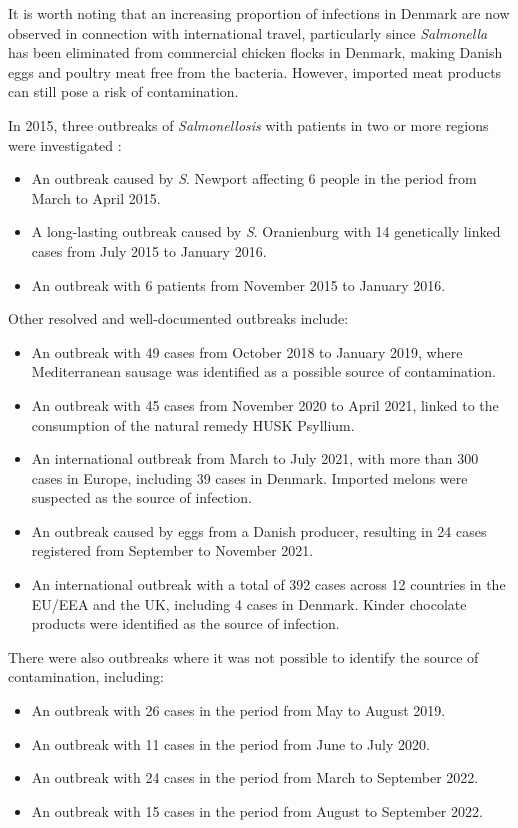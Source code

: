 \documentclass[a4paper,twoside,11pt]{report} %
\theoremstyle{definition}
\theoremstyle{definition}
\theoremstyle{definition}
\theoremstyle{definition}
\theoremstyle{remark}
\begin{document}
It is worth noting that an increasing proportion of infections in Denmark are now observed in connection with international travel, particularly since \textit{Salmonella} has been eliminated from commercial chicken flocks in Denmark, making Danish eggs and poultry meat free from the bacteria. However, imported meat products can still pose a risk of contamination.

In 2015, three outbreaks of \textit{Salmonellosis} with patients in two or more regions were investigated \autocite{Helwigh_2016}:

\begin{itemize}
  \item An outbreak caused by \textit{S}. Newport affecting 6 people in the period from March to April 2015.
  \item A long-lasting outbreak caused by \textit{S}. Oranienburg with 14 genetically linked cases from July 2015 to January 2016.
  \item An outbreak with 6 patients from November 2015 to January 2016.
\end{itemize}

Other resolved and well-documented outbreaks include:

\begin{itemize}
  \item An outbreak with 49 cases from October 2018 to January 2019, where Mediterranean sausage was identified as a possible source of contamination.
  \item An outbreak with 45 cases from November 2020 to April 2021, linked to the consumption of the natural remedy HUSK Psyllium.
  \item An international outbreak from March to July 2021, with more than 300 cases in Europe, including 39 cases in Denmark. Imported melons were suspected as the source of infection.
  \item An outbreak caused by eggs from a Danish producer, resulting in 24 cases registered from September to November 2021.
  \item An international outbreak with a total of 392 cases across 12 countries in the EU/EEA and the UK, including 4 cases in Denmark. Kinder chocolate products were identified as the source of infection.
\end{itemize}

There were also outbreaks where it was not possible to identify the source of contamination, including:

\begin{itemize}
  \item An outbreak with 26 cases in the period from May to August 2019.
  \item An outbreak with 11 cases in the period from June to July 2020.
  \item An outbreak with 24 cases in the period from March to September 2022.
  \item An outbreak with 15 cases in the period from August to September 2022.
\end{itemize}
\end{document}
